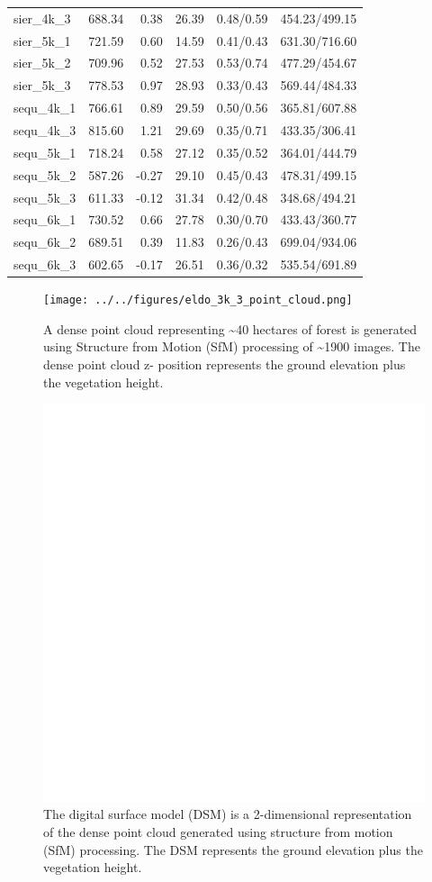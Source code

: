\documentclass[]{article}
\begin{document}
\begin{longtable}[]{@{}lrrrll@{}}
sier\_4k\_3 & 688.34 & 0.38 & 26.39 & 0.48/0.59 &
454.23/499.15\tabularnewline
sier\_5k\_1 & 721.59 & 0.60 & 14.59 & 0.41/0.43 &
631.30/716.60\tabularnewline
sier\_5k\_2 & 709.96 & 0.52 & 27.53 & 0.53/0.74 &
477.29/454.67\tabularnewline
sier\_5k\_3 & 778.53 & 0.97 & 28.93 & 0.33/0.43 &
569.44/484.33\tabularnewline
sequ\_4k\_1 & 766.61 & 0.89 & 29.59 & 0.50/0.56 &
365.81/607.88\tabularnewline
sequ\_4k\_3 & 815.60 & 1.21 & 29.69 & 0.35/0.71 &
433.35/306.41\tabularnewline
sequ\_5k\_1 & 718.24 & 0.58 & 27.12 & 0.35/0.52 &
364.01/444.79\tabularnewline
sequ\_5k\_2 & 587.26 & -0.27 & 29.10 & 0.45/0.43 &
478.31/499.15\tabularnewline
sequ\_5k\_3 & 611.33 & -0.12 & 31.34 & 0.42/0.48 &
348.68/494.21\tabularnewline
sequ\_6k\_1 & 730.52 & 0.66 & 27.78 & 0.30/0.70 &
433.43/360.77\tabularnewline
sequ\_6k\_2 & 689.51 & 0.39 & 11.83 & 0.26/0.43 &
699.04/934.06\tabularnewline
sequ\_6k\_3 & 602.65 & -0.17 & 26.51 & 0.36/0.32 &
535.54/691.89\tabularnewline
\bottomrule
\end{longtable}

\begin{figure}
\centering
\texttt{[image: ../../figures/eldo\_3k\_3\_point\_cloud.png]}
\caption{A dense point cloud representing \textasciitilde{}40 hectares
of forest is generated using Structure from Motion (SfM) processing of
\textasciitilde{}1900 images. The dense point cloud z- position
represents the ground elevation plus the vegetation height.}
\end{figure}

\begin{figure}
\centering
\includegraphics{../../figures/eldo_3k_3_dsm.png}
\caption{The digital surface model (DSM) is a 2-dimensional
representation of the dense point cloud generated using structure from
motion (SfM) processing. The DSM represents the ground elevation plus
the vegetation height.}
\end{figure}
\end{document}
